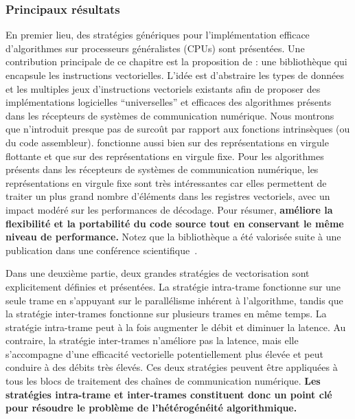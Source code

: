 \subsubsection*{Principaux résultats}

En premier lieu, des stratégies génériques pour l'implémentation efficace
d'algorithmes sur processeurs généralistes (CPUs) sont présentées. Une
contribution principale de ce chapitre est la proposition de \MIPP : une
bibliothèque qui encapsule les instructions vectorielles. L'idée est d'abstraire
les types de données et les multiples jeux d’instructions vectoriels existants
afin de proposer des implémentations logicielles ``universelles'' et efficaces
des algorithmes présents dans les récepteurs de systèmes de communication
numérique. Nous montrons que \MIPP n'introduit presque pas de surcoût par
rapport aux fonctions intrinsèques (ou du code assembleur). \MIPP fonctionne
aussi bien sur des représentations en virgule flottante et que sur des
représentations en virgule fixe. Pour les algorithmes présents dans les
récepteurs de systèmes de communication numérique, les représentations en
virgule fixe sont très intéressantes car elles permettent de traiter un plus
grand nombre d'éléments dans les registres vectoriels, avec un impact modéré sur
les performances de décodage. Pour résumer, \textbf{\MIPP améliore la
flexibilité et la portabilité du code source tout en conservant le même niveau
de performance.} Notez que la bibliothèque \MIPP a été valorisée suite à une
publication dans une conférence scientifique~\cite{Cassagne2018}.

Dans une deuxième partie, deux grandes stratégies de vectorisation sont
explicitement définies et présentées. La stratégie intra-trame fonctionne
sur une seule trame en s'appuyant sur le parallélisme inhérent à l'algorithme,
tandis que la stratégie inter-trames fonctionne sur plusieurs trames en
même temps. La stratégie intra-trame peut à la fois augmenter le débit et
diminuer la latence. Au contraire, la stratégie inter-trames n'améliore pas la
latence, mais elle s'accompagne d'une efficacité vectorielle potentiellement
plus élevée et peut conduire à des débits très élevés. Ces deux stratégies
peuvent être appliquées à tous les blocs de traitement des chaînes de
communication numérique. \textbf{Les stratégies intra-trame et inter-trames
constituent donc un point clé pour résoudre le problème de l'hétérogénéité
algorithmique.}

